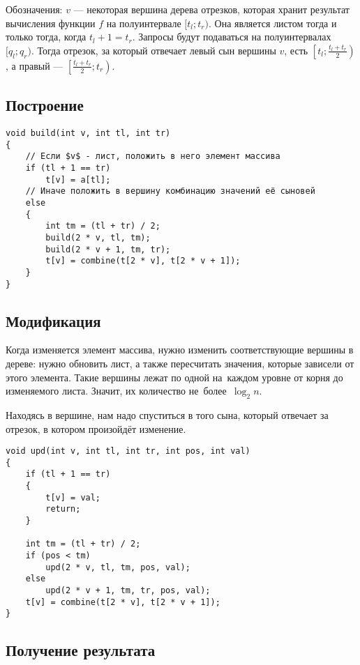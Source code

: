 Обозначения: $v$ --- некоторая вершина дерева отрезков, которая хранит результат вычисления функции $f$ на полуинтервале $[t_l; t_r)$. Она является листом тогда и только тогда, когда $t_l + 1 = t_r$. Запросы будут подаваться на полуинтервалах $[q_l; q_r)$. Тогда отрезок, за который отвечает левый сын вершины $v$, есть $\left[t_l; \frac{t_l + t_r}{2}\right)$, а правый --- $\left[\frac{t_l + t_r}{2}; t_r\right)$.

\subsection{Построение}

\begin{verbatim}
void build(int v, int tl, int tr)
{
    // Если $v$ - лист, положить в него элемент массива
    if (tl + 1 == tr)
        t[v] = a[tl];
    // Иначе положить в вершину комбинацию значений её сыновей
    else
    {
        int tm = (tl + tr) / 2;
        build(2 * v, tl, tm);
        build(2 * v + 1, tm, tr);
        t[v] = combine(t[2 * v], t[2 * v + 1]);
    }
}
\end{verbatim}

\subsection{Модификация}

Когда изменяется элемент массива, нужно изменить соответствующие вершины в дереве: нужно обновить лист, а также пересчитать значения, которые зависели от этого элемента. Такие вершины лежат по одной на~каждом уровне от корня до изменяемого листа. Значит, их количество не~более~$\log_2n$.

Находясь в вершине, нам надо спуститься в того сына, который отвечает за отрезок, в котором произойдёт изменение.

\begin{verbatim}
void upd(int v, int tl, int tr, int pos, int val)
{
    if (tl + 1 == tr)
    {
        t[v] = val;
        return;
    }

    int tm = (tl + tr) / 2;
    if (pos < tm)
        upd(2 * v, tl, tm, pos, val);
    else
        upd(2 * v + 1, tm, tr, pos, val);
    t[v] = combine(t[2 * v], t[2 * v + 1]);
}
\end{verbatim}

\subsection{Получение результата}

